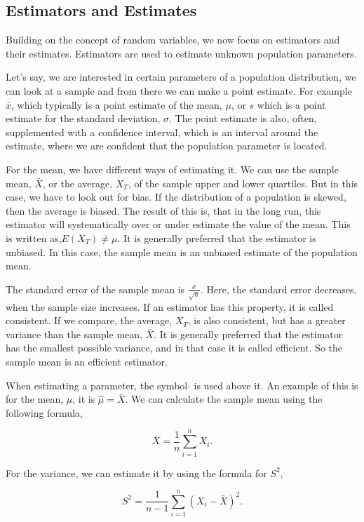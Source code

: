 \subsection{Estimators and Estimates}
Building on the concept of random variables, we now focus on estimators and their estimates. Estimators are used to estimate unknown population parameters. \newline

\noindent Let's say, we are interested in certain parameters of a population distribution, we can look at a sample and from there we can make a point estimate. For example $\bar{x}$, which typically is a point estimate of the mean, $\mu$, or $s$ which is a point estimate for the standard deviation, $\sigma$. The point estimate is also, often, supplemented with a confidence interval, which is an interval around the estimate, where we are confident that the population parameter is located.
\newline

\noindent For the mean, we have different ways of estimating it. We can use the sample mean, $\bar{X}$, or the average, $X_T$, of the sample upper and lower quartiles. 
But in this case, we have to look out for bias. If the distribution of a population is skewed, then the average is biased. The result of this is, that in the long run, this estimator will systematically over or under estimate the value of the mean. This is written as,$E(X_T) \neq \mu$. It is generally preferred that the estimator is unbiased. In this case, the sample mean is an unbiased estimate of the population mean.
\newline

\noindent The standard error of the sample mean is $\frac{\sigma}{\sqrt{n}}$. Here, the standard error decreases, when the sample size increases. If an estimator has this property, it is called consistent. If we compare, the average, $X_T$, is also consistent, but has a greater variance than the sample mean, $\bar{X}$. It is generally preferred that the estimator has the smallest possible variance, and in that case it is called efficient. So the sample mean is an efficient estimator.\newline

\noindent When estimating a parameter, the symbol $\hat{}$ is used above it. An example of this is for the mean, $\mu$, it is $\hat{\mu} = \bar{X}$. We can calculate the sample mean using the following formula,

\begin{equation}
	\bar{X}=\frac{1}{n} \sum_{i=1}^{n}X_i.
\end{equation}


\noindent For the variance, we can estimate it by using the formula for $S^2$,

\begin{equation}
	S^2=\frac{1}{n-1} \sum_{i=1}^{n}(X_i-\bar{X})^2.
\end{equation}
